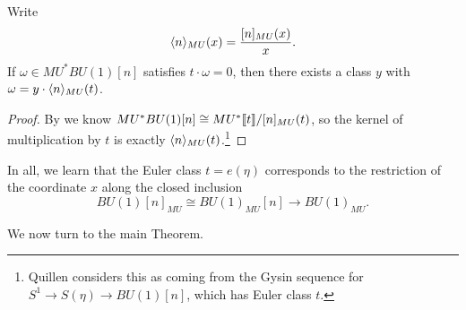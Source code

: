 \begin{corollary}\label{QuillensGysinFact}
Write \[\langle n\rangle_{MU}(x) = \frac{[n]_{MU}(x)}{x}.\]  If $\omega \in MU^* BU(1)[n]$ satisfies $t \cdot \omega = 0$, then there exists a class $y$ with $\omega = y \cdot \langle n\rangle_{MU}(t)$.
\end{corollary}
\begin{proof}
By  we know $MU^* BU(1)[n] \cong MU^*\llbracket{t}\rrbracket / [n]_{MU}(t)$, so the kernel of multiplication by $t$ is exactly $\langle n\rangle_{MU}(t)$.\footnote{Quillen considers this as coming from the Gysin sequence for $S^1 \to S(\eta) \to BU(1)[n]$, which has Euler class $t$.}
\end{proof}

\noindent In all, we learn that the Euler class $t = e(\eta)$ corresponds to the restriction of the coordinate $x$ along the closed inclusion \[BU(1)[n]_{MU} \cong BU(1)_{MU}[n] \to BU(1)_{MU}.\]

We now turn to the main Theorem.

